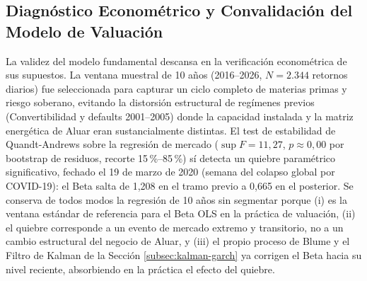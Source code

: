\documentclass[11pt,a4paper]{article}
\begin{document}
\subsection{Diagnóstico Econométrico y Convalidación del Modelo de Valuación}
La validez del modelo fundamental descansa en la verificación econométrica de sus supuestos. La ventana muestral de 10 años (2016--2026, $N=2.344$ retornos diarios) fue seleccionada para capturar un ciclo completo de materias primas y riesgo soberano, evitando la distorsión estructural de regímenes previos (Convertibilidad y defaults 2001--2005) donde la capacidad instalada y la matriz energética de Aluar eran sustancialmente distintas. El test de estabilidad de Quandt-Andrews sobre la regresión de mercado ($\sup F = 11,27$, $p \approx 0,00$ por bootstrap de residuos, recorte 15\,\%--85\,\%) sí detecta un quiebre paramétrico significativo, fechado el 19 de marzo de 2020 (semana del colapso global por COVID-19): el Beta salta de 1,208 en el tramo previo a 0,665 en el posterior. Se conserva de todos modos la regresión de 10 años sin segmentar porque (i) es la ventana estándar de referencia para el Beta OLS en la práctica de valuación, (ii) el quiebre corresponde a un evento de mercado extremo y transitorio, no a un cambio estructural del negocio de Aluar, y (iii) el propio proceso de Blume y el Filtro de Kalman de la Sección \ref{subsec:kalman-garch} ya corrigen el Beta hacia su nivel reciente, absorbiendo en la práctica el efecto del quiebre.
\end{document}
